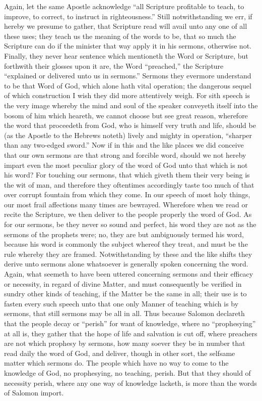Again, let the same Apostle acknowledge “all Scripture profitable to teach, to improve, to correct, to instruct in righteousness.” Still notwithstanding we err, if hereby we presume to gather, that Scripture read will avail unto any one of all these uses; they teach us the meaning of the words to be, that so much the Scripture can do if the minister that way apply it in his sermons, otherwise not.
Finally, they never hear sentence which mentioneth the  Word or Scripture, but forthwith their glosses upon it are, the Word “preached,” the Scripture “explained or delivered unto us in sermons.” Sermons they evermore understand to be that Word of God, which alone hath vital operation; the dangerous sequel of which construction I wish they did more attentively weigh. For sith speech is the very image whereby the mind and soul of the speaker conveyeth itself into the bosom of him which heareth, we cannot choose but see great reason, wherefore the word that proceedeth from God, who is himself very truth and life, should be (as the Apostle to the Hebrews noteth) lively and mighty in operation, “sharper than any two-edged sword.” Now if in this and the like places we did conceive that our own sermons are that strong and forcible word, should we not hereby impart even the most peculiar glory of the word of God unto that which is not his word? For touching our sermons, that which giveth them their very being is the wit of man, and therefore  they oftentimes accordingly taste too much of that over corrupt fountain from which they come. In our speech of most holy things, our most frail affections many times are bewrayed.
Wherefore when we read or recite the Scripture, we then deliver to the people properly the word of God. As for our sermons, be they never so sound and perfect, his word they are not as the sermons of the prophets were; no, they are but ambiguously termed his word, because his word is commonly the subject whereof they treat, and must be the rule whereby they are framed. Notwithstanding by these and the like shifts they derive unto sermons alone whatsoever is generally spoken concerning the word.
Again, what seemeth to have been uttered concerning sermons and their efficacy or necessity, in regard of divine Matter, and must consequently be verified in sundry other kinds of teaching, if the Matter be the same in all; their use is to fasten every such speech unto that one only Manner of teaching which is by sermons, that still sermons may be all in all. Thus because Salomon declareth that the people decay or “perish” for want of knowledge, where no “prophesying” at all is, they gather that the hope of life and salvation is cut off, where preachers are not which prophesy by sermons, how many soever they be in number that read daily the word of God, and deliver, though in other sort, the selfsame matter which sermons do. The people which have  no way to come to the knowledge of God, no prophesying, no teaching, perish. But that they should of necessity perish, where any one way of knowledge lacketh, is more than the words of Salomon import.
